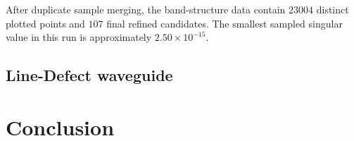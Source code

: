 \documentclass[11pt,fleqn]{article}
\theoremstyle{definition}
\theoremstyle{remark}
\begin{document}
After duplicate sample merging, the band-structure data contain \(23004\)
distinct plotted points and \(107\) final refined candidates. The smallest
sampled singular value in this run is approximately \(2.50\times10^{-15}\).

\subsection{Line-Defect waveguide}

\section{Conclusion}


\end{document}
